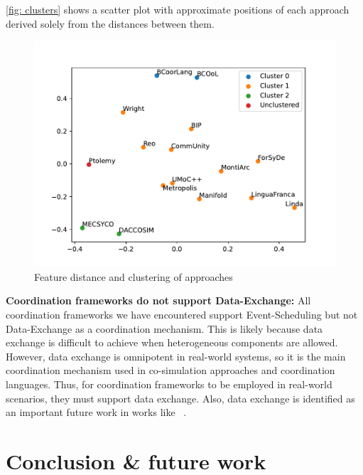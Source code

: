 \documentclass[runningheads]{llncs}
\begin{document}
\autoref{fig: clusters} shows a scatter plot with approximate positions of each approach derived solely from the distances between them.

\begin{figure}[ht]
	\centering
	\includegraphics[width=1\textwidth]{images/approach_scatter}
	\caption{Feature distance and clustering of approaches}
	\label{fig: clusters}
\end{figure}









\textbf{Coordination frameworks do not support Data-Exchange:} All coordination frameworks we have encountered support \textsf{Event-Scheduling} but not \textsf{Data-Exchange} as a coordination mechanism.
This is likely because data exchange is difficult to achieve when heterogeneous components are allowed.
However, data exchange is omnipotent in real-world systems, so it is the main coordination mechanism used in co-simulation approaches and coordination languages.
Thus, for coordination frameworks to be employed in real-world scenarios, they must support data exchange.
Also, data exchange is identified as an important future work in works like ~\cite{krauterBehavioralConsistencyMultimodeling2023,varalarsenBCOolBehavioralCoordination2016}.

\section{Conclusion \& future work} \label{sec: conclusion}



\end{document}
